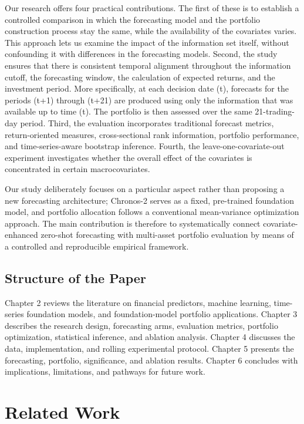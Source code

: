 \documentclass[12pt,a4paper,twoside,openany]{book}
\begin{document}
Our research offers four practical contributions. The first of these is to establish a controlled comparison in which the forecasting model and the portfolio construction process stay the same, while the availability of the covariates varies. This approach lets us examine the impact of the information set itself, without confounding it with differences in the forecasting models. Second, the study ensures that there is consistent temporal alignment throughout the information cutoff, the forecasting window, the calculation of expected returns, and the investment period. More specifically, at each decision date (t), forecasts for the periods (t+1) through (t+21) are produced using only the information that was available up to time (t). The portfolio is then assessed over the same 21-trading-day period. Third, the evaluation incorporates traditional forecast metrics, return-oriented measures, cross-sectional rank information, portfolio performance, and time-series-aware bootstrap inference. Fourth, the leave-one-covariate-out experiment investigates whether the overall effect of the covariates is concentrated in certain macrocovariates.

Our study deliberately focuses on a particular aspect rather than proposing a new forecasting architecture; Chronos-2 serves as a fixed, pre-trained foundation model, and portfolio allocation follows a conventional mean-variance optimization approach. The main contribution is therefore to systematically connect covariate-enhanced zero-shot forecasting with multi-asset portfolio evaluation by means of a controlled and reproducible empirical framework.

\section{Structure of the Paper}\label{structure-of-the-paper}

Chapter 2 reviews the literature on financial predictors, machine
learning, time-series foundation models, and foundation-model portfolio
applications. Chapter 3 describes the research design, forecasting arms,
evaluation metrics, portfolio optimization, statistical inference, and
ablation analysis. Chapter 4 discusses the data, implementation, and
rolling experimental protocol. Chapter 5 presents the forecasting, 
portfolio, significance, and ablation results. Chapter 6
concludes with implications, limitations, and pathways for future work.

\chapter{Related Work}\label{related-work}
\end{document}

